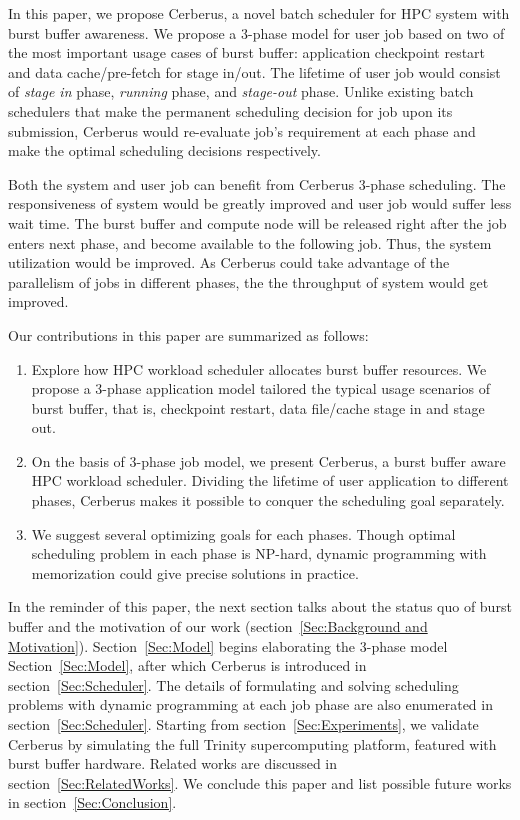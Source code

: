In this paper, we propose Cerberus, 
a novel batch scheduler for HPC system with burst buffer awareness. 
We propose a 3-phase model for user job 
based on two of the most important usage cases of burst buffer: 
application checkpoint restart and data cache/pre-fetch for stage in/out. 
The lifetime of user job would consist of \textit{stage in} phase, 
\textit{running} phase, and \textit{stage-out} phase. 
Unlike existing batch schedulers that 
make the permanent scheduling decision for job upon its submission, 
Cerberus would re-evaluate job's requirement at each phase 
and make the optimal scheduling decisions respectively.

Both the system and user job can benefit from Cerberus 3-phase scheduling. The responsiveness of system would be greatly improved and user job would suffer less wait time. 
The burst buffer and compute node will be released right after the job enters next phase, and become available to the following job. Thus, the system utilization would be improved.
As Cerberus could take advantage of the parallelism of jobs in different phases, the the throughput of system would get improved.

Our contributions in this paper are summarized as follows:

\begin{enumerate}
        \item Explore how HPC workload scheduler allocates burst buffer resources.
                We propose a 3-phase application model tailored the typical
                usage scenarios of burst buffer, that is, checkpoint restart,
                data file/cache stage in and stage out.
        \item On the basis of 3-phase job model, we present Cerberus,
                a burst buffer aware HPC workload scheduler.
                Dividing the lifetime of user application to different phases,
                Cerberus makes it possible to conquer the scheduling goal separately.
        \item We suggest several optimizing goals for each phases.
                Though optimal scheduling problem in each phase is NP-hard,
                dynamic programming with memorization could give precise solutions
                in practice.
\end{enumerate}

In the reminder of this paper,
the next section talks about the status quo of burst buffer and the motivation of our work (section~\ref{Sec:Background and Motivation}).
Section~\ref{Sec:Model} begins elaborating the 3-phase model Section~\ref{Sec:Model},
after which Cerberus is introduced in section~\ref{Sec:Scheduler}.
The details of formulating and solving scheduling problems with
dynamic programming at each job phase are also
enumerated in section~\ref{Sec:Scheduler}.
Starting from section~\ref{Sec:Experiments}, we validate Cerberus
by simulating the full Trinity supercomputing platform, featured with
burst buffer hardware.
Related works are discussed in section~\ref{Sec:RelatedWorks}.
We conclude this paper and list possible future works in section~\ref{Sec:Conclusion}.

